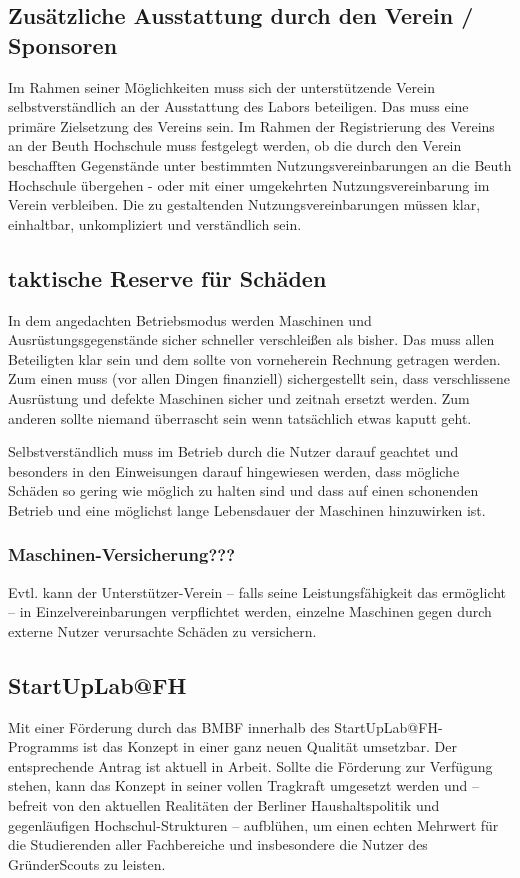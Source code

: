 \documentclass[parskip=half,headsepline,footsepline,titlepage]{scrartcl}
\begin{document}
\subsection{Zusätzliche Ausstattung durch den Verein / Sponsoren}
Im Rahmen seiner Möglichkeiten muss sich der unterstützende Verein selbstverständlich an der Ausstattung des Labors beteiligen. Das muss eine primäre Zielsetzung des Vereins sein.
Im Rahmen der Registrierung des Vereins an der Beuth Hochschule muss festgelegt werden, ob die durch den Verein beschafften Gegenstände unter bestimmten Nutzungsvereinbarungen an die Beuth Hochschule übergehen - oder mit einer umgekehrten Nutzungsvereinbarung im Verein verbleiben. Die zu gestaltenden Nutzungsvereinbarungen müssen klar, einhaltbar, unkompliziert und verständlich sein.

\subsection{taktische Reserve für Schäden}
In dem angedachten Betriebsmodus werden Maschinen und Ausrüstungsgegenstände sicher schneller verschleißen als bisher. Das muss allen Beteiligten klar sein und dem sollte von vorneherein Rechnung getragen werden.
Zum einen muss (vor allen Dingen finanziell) sichergestellt sein, dass verschlissene Ausrüstung und defekte Maschinen sicher und zeitnah ersetzt werden. Zum anderen sollte niemand überrascht sein wenn tatsächlich etwas kaputt geht.

Selbstverständlich muss im Betrieb durch die Nutzer darauf geachtet und besonders in den Einweisungen darauf hingewiesen werden, dass mögliche Schäden so gering wie möglich zu halten sind und dass auf einen schonenden Betrieb und eine möglichst lange Lebensdauer der Maschinen hinzuwirken ist.


\subsubsection{Maschinen-Versicherung???}
Evtl. kann der Unterstützer-Verein -- falls seine Leistungsfähigkeit das ermöglicht -- in Einzelvereinbarungen verpflichtet werden, einzelne Maschinen gegen durch externe Nutzer verursachte Schäden zu versichern.

\subsection{StartUpLab@FH}
Mit einer Förderung durch das BMBF innerhalb des StartUpLab@FH-Programms ist das Konzept in einer ganz neuen Qualität umsetzbar. Der entsprechende Antrag ist aktuell in Arbeit. Sollte die Förderung zur Verfügung stehen, kann das Konzept in seiner vollen Tragkraft umgesetzt werden und -- befreit von den aktuellen Realitäten der Berliner Haushaltspolitik und gegenläufigen Hochschul-Strukturen -- aufblühen, um einen echten Mehrwert für die Studierenden aller Fachbereiche und insbesondere die Nutzer des GründerScouts zu leisten.
\end{document}

